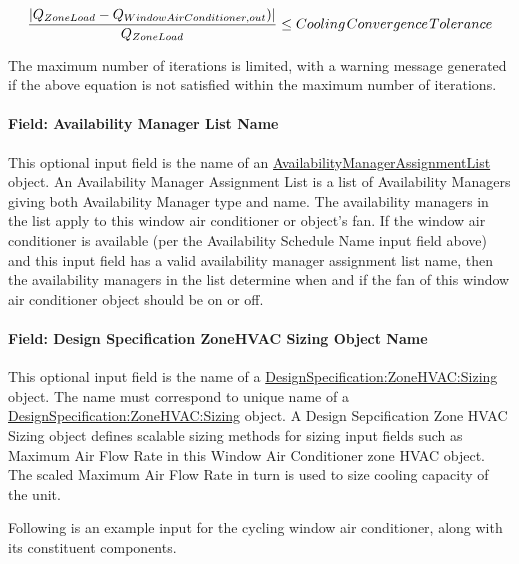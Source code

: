 \begin{equation}
\frac{{\left| {{Q_{ZoneLoad}} - {Q_{WindowAirConditioner,out}})} \right|}}{{{Q_{ZoneLoad}}}} \le Cooling{\kern 1pt} Convergence{\kern 1pt} Tolerance
\end{equation}

The maximum number of iterations is limited, with a warning message generated if the above equation is not satisfied within the maximum number of iterations.

\paragraph{Field: Availability Manager List Name}\label{field-availability-manager-list-name-5}

This optional input field is the name of an \hyperref[availabilitymanagerassignmentlist]{AvailabilityManagerAssignmentList} object. An Availability Manager Assignment List is a list of Availability Managers giving both Availability Manager type and name. The availability managers in the list apply to this window air conditioner or object's fan. If the window air conditioner is available (per the Availability Schedule Name input field above) and this input field has a valid availability manager assignment list name, then the availability managers in the list determine when and if the fan of this window air conditioner object should be on or off.

\paragraph{Field: Design Specification ZoneHVAC Sizing Object Name}\label{field-design-specification-zonehvac-sizing-object-name-5}

This optional input field is the name of a \hyperref[designspecificationzonehvacsizing]{DesignSpecification:ZoneHVAC:Sizing} object. The name must correspond to unique name of a \hyperref[designspecificationzonehvacsizing]{DesignSpecification:ZoneHVAC:Sizing} object. A Design Sepcification Zone HVAC Sizing object defines scalable sizing methods for sizing input fields such as Maximum Air Flow Rate in this Window Air Conditioner zone HVAC object. The scaled Maximum Air Flow Rate in turn is used to size cooling capacity of the unit.

Following is an example input for the cycling window air conditioner, along with its constituent components.

